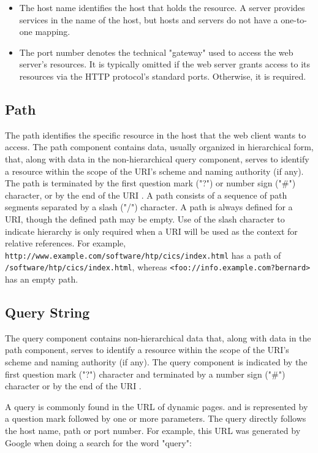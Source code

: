 \begin{itemize}
  \item The host name identifies the host that holds the resource. A server provides services in the name of the host, but hosts and servers do not have a one-to-one mapping.
  \item The port number denotes the technical "gateway" used to access the web server's resources. It is typically omitted if the web server grants access to its resources via the HTTP protocol's standard ports. Otherwise, it is required.
\end{itemize}

\subsection{Path}
\label{url_anatomy_path}
The path identifies the specific resource in the host that the web client wants to access. The path component contains data, usually organized in hierarchical form, that, along with data in the non-hierarchical query component, serves to identify a resource within the scope of the URI's scheme and naming authority (if any).  The path is terminated by the first question mark ("?") or number sign ("\#") character, or by the end of the URI \autocite{berners2005uniform}. A path consists of a sequence of path segments separated by a slash ("/") character.  A path is always defined for a URI, though the defined path may be empty.  Use of the slash character to indicate hierarchy is only required when a URI will be used as the context for relative references.  For example, \texttt{http://www.example.com/software/htp/cics/index.html} has a path of \texttt{/software/htp/cics/index.html}, whereas \texttt{<foo://info.example.com?bernard>} has an empty path.

\subsection{Query String}
\label{url_anatomy_query}
The query component contains non-hierarchical data that, along with data in the path component, serves to identify a resource within the scope of the URI's scheme and naming authority (if any).  The query component is indicated by the first question mark ("?") character and terminated by a number sign ("\#") character or by the end of the URI \autocite{berners2005uniform}.

A query is commonly found in the URL of dynamic pages. and is represented by a question mark followed by one or more parameters. The query directly follows the host name, path or port number. For example, this URL was generated by Google when doing a search for the word "query":

